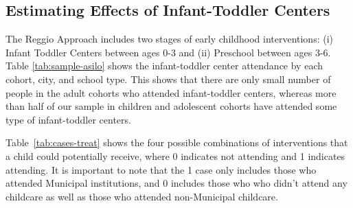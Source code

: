 \subsection{Estimating Effects of Infant-Toddler Centers}
The Reggio Approach includes two stages of early childhood interventions: (i) Infant Toddler Centers between ages 0-3 and (ii) Preschool between ages 3-6. Table \ref{tab:sample-asilo} shows the infant-toddler center attendance by each cohort, city, and school type. This shows that there are only small number of people in the adult cohorts who attended infant-toddler centers, whereas more than half of our sample in children and adolescent cohorts have attended some type of infant-toddler centers.

\begin{table}[H]
\centering
{}
\end{table}



Table~\ref{tab:cases-treat} shows the four possible combinations of interventions that a child could potentially receive, where 0 indicates not attending and 1 indicates attending. It is important to note that the 1 case only includes those who attended Municipal institutions, and 0 includes those who who didn't attend any childcare as well as those who attended non-Municipal childcare.

